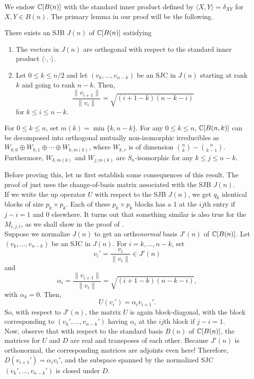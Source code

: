 	We endow $\mathbb{C}[B(n)]$ with the standard inner product defined by $\langle X,Y\rangle = \delta_{XY}$ for $X,Y \in B(n)$. The primary lemma in our proof will be the following.

	\begin{flem}
		\label{schrijver-lem}
		There exists an SJB $J(n)$ of $\mathbb{C}[B(n)]$ satisfying
		\begin{enumerate}[label=(\alph*)]
			\item The vectors in $J(n)$ are orthogonal with respect to the standard inner product $\langle \cdot,\cdot\rangle$.
			\item Let $0 \le k \le n/2$ and let $(v_k,\ldots,v_{n-k})$ be an SJC in $J(n)$ starting at rank $k$ and going to rank $n-k$. Then,
			\[ \frac{\|v_{i+1}\|}{\|v_i\|} = \sqrt{(i+1-k)(n-k-i)} \]
			for $k \le i \le n-k$.
		\end{enumerate}
	\end{flem}

	\begin{flem}
		\label{schrijver-lem1}
		For $0 \le k \le n$, set $m(k) = \min\{k,n-k\}$. For any $0 \le k \le n$, $\mathbb{C}[B(n,k)]$ can be decomposed into orthogonal mutually non-isomorphic irreducibles as $W_{k,0} \oplus W_{k,1} \oplus \cdots \oplus W_{k,m(k)}$, where $W_{k,r}$ is of dimension $\binom{n}{k} - \binom{n}{k-1}$. Furthermore, $W_{k,m(k)}$ and $W_{j,m(k)}$ are $S_n$-isomorphic for any $k \le j \le n-k$.
	\end{flem}

	Before proving this, let us first establish some consequences of this result. The proof of  just uses the change-of-basis matrix associated with the SJB $J(n)$. \\

	If we write the up operator $U$ with respect to the SJB $J(n)$, we get $q_k$ identical blocks of size $p_k \times p_k$. Each of these $p_k \times p_k$ blocks has a $1$ at the $ij$th entry if $j-i=1$ and $0$ elsewhere. It turns out that something similar is also true for the $M_{i,j,t}$, as we shall show in the proof of .\\
	Suppose we normalize $J(n)$ to get an ortho\emph{normal} basis $J'(n)$ of $\mathbb{C}[B(n)]$. Let $(v_k,\ldots,v_{n-k})$ be an SJC in $J(n)$. For $i=k,\ldots,n-k$, set
	\[ v_i' = \frac{v_i}{\|v_i\|} \in J'(n) \]
	and
	\[ \alpha_i = \frac{\|v_{i+1}\|}{\|v_i\|} = \sqrt{(i+1-k)(n-k-i)}, \]
	with $\alpha_k = 0$. Then,
	\[ U(v_i') = \alpha_i v_{i+1}'. \]
	So, with respect to $J'(n)$, the matrix $U$ is again block-diagonal, with the block corresponding to $(v_k',\ldots,v_{n-k}')$ having $\alpha_i$ at the $ij$th block if $j-i=1$. \\
	Now, observe that with respect to the standard basis $B(n)$ of $\mathbb{C}[B(n)]$, the matrices for $U$ and $D$ are real and transposes of each other. Because $J'(n)$ is orthonormal, the corresponding matrices are adjoints even here! Therefore, $D(v_{i+1}') = \alpha_i v_i'$, and the subspace spanned by the normalized SJC $(v_k',\ldots,v_{n-k}')$ is closed under $D$.

